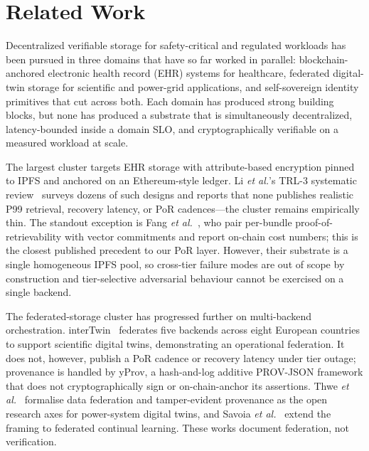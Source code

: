 \section{Related Work}
\label{sec:related}

Decentralized verifiable storage for safety-critical and regulated workloads has been pursued in three domains that have so far worked in parallel: blockchain-anchored electronic health record (EHR) systems for healthcare, federated digital-twin storage for scientific and power-grid applications, and self-sovereign identity primitives that cut across both. Each domain has produced strong building blocks, but none has produced a substrate that is simultaneously decentralized, latency-bounded inside a domain SLO, and cryptographically verifiable on a measured workload at scale.

The largest cluster targets EHR storage with attribute-based encryption pinned to IPFS and anchored on an Ethereum-style ledger. Li \emph{et al.}'s TRL-3 systematic review~\cite{li2025trl} surveys dozens of such designs and reports that none publishes realistic P99 retrieval, recovery latency, or PoR cadences---the cluster remains empirically thin. The standout exception is Fang \emph{et al.}~\cite{fang2024metaverse}, who pair per-bundle proof-of-retrievability with vector commitments and report on-chain cost numbers; this is the closest published precedent to our PoR layer. However, their substrate is a single homogeneous IPFS pool, so cross-tier failure modes are out of scope by construction and tier-selective adversarial behaviour cannot be exercised on a single backend.

The federated-storage cluster has progressed further on multi-backend orchestration. interTwin~\cite{manzi2025intertwin} federates five backends across eight European countries to support scientific digital twins, demonstrating an operational federation. It does not, however, publish a PoR cadence or recovery latency under tier outage; provenance is handled by yProv, a hash-and-log additive PROV-JSON framework that does not cryptographically sign or on-chain-anchor its assertions. Thwe \emph{et al.}~\cite{thwe2025dtps} formalise data federation and tamper-evident provenance as the open research axes for power-system digital twins, and Savoia \emph{et al.}~\cite{savoia2026fcldt} extend the framing to federated continual learning. These works document federation, not verification.

